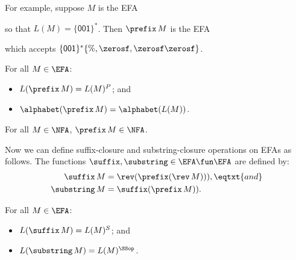 For example, suppose $M$ is the EFA
\begin{center}

\end{center}
so that $L(M)=\{\mathsf{001}\}^*$.  Then
$\prefix\,M$ is the EFA
\begin{center}

\end{center}
which accepts
$\{\mathsf{001}\}^*\{\%,\zerosf,\zerosf\zerosf\}$.

\begin{theorem}
\label{EFAPrefix}
For all $M\in\EFA$:
\begin{itemize}
\item $L(\prefix\,M) = L(M)^P$; and

\item $\alphabet(\prefix\,M) = \alphabet(L(M))$.
\end{itemize}
\end{theorem}

\begin{proposition}
For all $M\in\NFA$, $\prefix\,M\in\NFA$.
\end{proposition}
%
%
%

Now we can define suffix-closure and substring-closure
operations on EFAs as follows.  The functions $\suffix,\substring\in
\EFA\fun\EFA$ are defined by:
%
%
%
%
%
%
\begin{align*}
\suffix\,M &= \rev(\prefix(\rev\,M))) , \eqtxt{and} \\
\substring\,M &= \suffix(\prefix\,M)) .
\end{align*}

\begin{theorem}
For all $M\in\EFA$:
\begin{itemize}
\item $L(\suffix\,M) = L(M)^S$; and

\item $L(\substring\,M) = L(M)^\SSop$.
\end{itemize}
\end{theorem}

